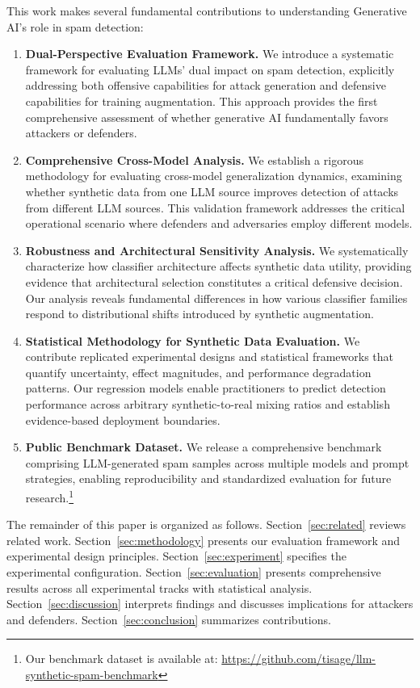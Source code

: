 This work makes several fundamental contributions to understanding Generative AI's role in spam detection:
\begin{enumerate}
    \item \textbf{Dual-Perspective Evaluation Framework.} We introduce a systematic framework for evaluating LLMs' dual impact on spam detection, explicitly addressing both offensive capabilities for attack generation and defensive capabilities for training augmentation. This approach provides the first comprehensive assessment of whether generative AI fundamentally favors attackers or defenders.

    \item \textbf{Comprehensive Cross-Model Analysis.} We establish a rigorous methodology for evaluating cross-model generalization dynamics, examining whether synthetic data from one LLM source improves detection of attacks from different LLM sources. This validation framework addresses the critical operational scenario where defenders and adversaries employ different models.

    \item \textbf{Robustness and Architectural Sensitivity Analysis.} We systematically characterize how classifier architecture affects synthetic data utility, providing evidence that architectural selection constitutes a critical defensive decision. Our analysis reveals fundamental differences in how various classifier families respond to distributional shifts introduced by synthetic augmentation.

    \item \textbf{Statistical Methodology for Synthetic Data Evaluation.} We contribute replicated experimental designs and statistical frameworks that quantify uncertainty, effect magnitudes, and performance degradation patterns. Our regression models enable practitioners to predict detection performance across arbitrary synthetic-to-real mixing ratios and establish evidence-based deployment boundaries.

    \item \textbf{Public Benchmark Dataset.} We release a comprehensive benchmark comprising LLM-generated spam samples across multiple models and prompt strategies, enabling reproducibility and standardized evaluation for future research.\footnote{Our benchmark dataset is available at: \url{https://github.com/tisage/llm-synthetic-spam-benchmark}}

\end{enumerate}


The remainder of this paper is organized as follows. Section~\ref{sec:related} reviews related work. Section~\ref{sec:methodology} presents our evaluation framework and experimental design principles. Section~\ref{sec:experiment} specifies the experimental configuration. Section~\ref{sec:evaluation} presents comprehensive results across all experimental tracks with statistical analysis. Section~\ref{sec:discussion} interprets findings and discusses implications for attackers and defenders. Section~\ref{sec:conclusion} summarizes contributions.
